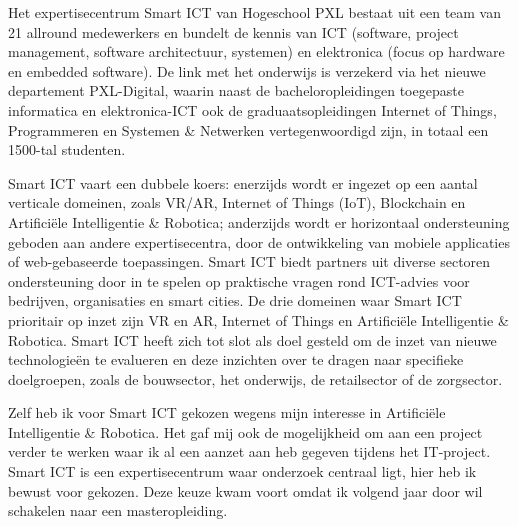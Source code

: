
Het expertisecentrum Smart ICT van Hogeschool PXL bestaat uit een team van 21 allround medewerkers en bundelt de kennis van ICT (software, project management, software architectuur, systemen) en elektronica (focus op hardware en embedded software). De link met het onderwijs is verzekerd via het nieuwe departement PXL-Digital, waarin naast de bacheloropleidingen toegepaste informatica en elektronica-ICT ook de graduaatsopleidingen Internet of Things, Programmeren en Systemen \& Netwerken vertegenwoordigd zijn, in totaal een 1500-tal studenten.

Smart ICT vaart een dubbele koers: enerzijds wordt er ingezet op een aantal verticale domeinen, zoals VR/AR, Internet of Things (IoT), Blockchain en Artifici\"ele Intelligentie \& Robotica; anderzijds wordt er horizontaal ondersteuning geboden aan andere expertisecentra, door de ontwikkeling van mobiele applicaties of web-gebaseerde toepassingen. Smart ICT biedt partners uit diverse sectoren ondersteuning door in te spelen op praktische vragen rond ICT-advies voor bedrijven, organisaties en smart cities. De drie domeinen waar Smart ICT prioritair op inzet zijn VR en AR, Internet of Things en Artifici\"ele Intelligentie \& Robotica. Smart ICT heeft zich tot slot als doel gesteld om de inzet van nieuwe technologie\"en te evalueren en deze inzichten over te dragen naar specifieke doelgroepen, zoals de bouwsector, het onderwijs, de retailsector of de zorgsector.

Zelf heb ik voor Smart ICT gekozen wegens mijn interesse in Artifici\"ele Intelligentie \& Robotica. Het gaf mij ook de mogelijkheid om aan een project verder te werken waar ik al een aanzet aan heb gegeven tijdens het IT-project. Smart ICT is een expertisecentrum waar onderzoek centraal ligt, hier heb ik bewust voor gekozen. Deze keuze kwam voort omdat ik volgend jaar door wil schakelen naar een masteropleiding.